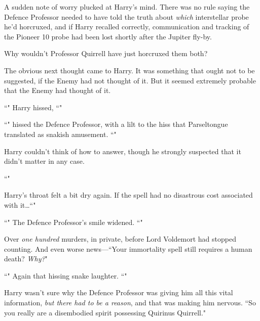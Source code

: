 A sudden note of worry plucked at Harry's mind. There was no rule saying the Defence Professor needed to have told the truth about \emph{which} interstellar probe he'd horcruxed, and if Harry recalled correctly, communication and tracking of the Pioneer 10 probe had been lost shortly after the Jupiter fly-by.

Why wouldn't Professor Quirrell have just horcruxed them both?

The obvious next thought came to Harry. It was something that ought not to be suggested, if the Enemy had not thought of it. But it seemed extremely probable that the Enemy had thought of it.

``" Harry hissed, ``"

``" hissed the Defence Professor, with a lilt to the hiss that Parseltongue translated as snakish amusement. ``"

Harry couldn't think of how to answer, though he strongly suspected that it didn't matter in any case.

``"

Harry's throat felt a bit dry again. If the spell had no disastrous cost associated with it…``"

``" The Defence Professor's smile widened. ``"

Over \emph{one hundred} murders, in private, before Lord Voldemort had stopped counting. And even worse news—``Your immortality spell still requires a human death? \emph{Why?}"

``" Again that hissing snake laughter. ``"

Harry wasn't sure why the Defence Professor was giving him all this vital information, \emph{but there had to be a reason}, and that was making him nervous. ``So you really are a disembodied spirit possessing Quirinus Quirrell."

